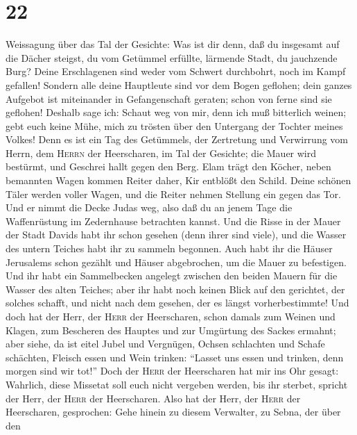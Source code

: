 \hypertarget{section-21}{%
\section{22}\label{section-21}}

 Weissagung über das Tal der Gesichte: Was ist dir denn,
daß du insgesamt auf die Dächer steigst,  du vom Getümmel
erfüllte, lärmende Stadt, du jauchzende Burg? Deine Erschlagenen sind
weder vom Schwert durchbohrt, noch im Kampf gefallen! 
Sondern alle deine Hauptleute sind vor dem Bogen geflohen; dein ganzes
Aufgebot ist miteinander in Gefangenschaft geraten; schon von ferne sind
sie geflohen!  Deshalb sage ich: Schaut weg von mir, denn
ich muß bitterlich weinen; gebt euch keine Mühe, mich zu trösten über
den Untergang der Tochter meines Volkes!  Denn es ist ein
Tag des Getümmels, der Zertretung und Verwirrung vom Herrn, dem
\textsc{Herrn} der Heerscharen, im Tal der Gesichte; die Mauer wird
bestürmt, und Geschrei hallt gegen den Berg.  Elam trägt
den Köcher, neben bemannten Wagen kommen Reiter daher, Kir entblößt den
Schild.  Deine schönen Täler werden voller Wagen, und die
Reiter nehmen Stellung ein gegen das Tor.  Und er nimmt
die Decke Judas weg, also daß du an jenem Tage die Waffenrüstung im
Zedernhause betrachten kannst.  Und die Risse in der Mauer
der Stadt Davids habt ihr schon gesehen (denn ihrer sind viele), und die
Wasser des untern Teiches habt ihr zu sammeln begonnen. 
Auch habt ihr die Häuser Jerusalems schon gezählt und Häuser
abgebrochen, um die Mauer zu befestigen.  Und ihr habt
ein Sammelbecken angelegt zwischen den beiden Mauern für die Wasser des
alten Teiches; aber ihr habt noch keinen Blick auf den gerichtet, der
solches schafft, und nicht nach dem gesehen, der es längst
vorherbestimmte!  Und doch hat der Herr, der
\textsc{Herr} der Heerscharen, schon damals zum Weinen und Klagen, zum
Bescheren des Hauptes und zur Umgürtung des Sackes ermahnt;
 aber siehe, da ist eitel Jubel und Vergnügen, Ochsen
schlachten und Schafe schächten, Fleisch essen und Wein trinken:
``Lasset uns essen und trinken, denn morgen sind wir tot!''
 Doch der \textsc{Herr} der Heerscharen hat mir ins Ohr
gesagt: Wahrlich, diese Missetat soll euch nicht vergeben werden, bis
ihr sterbet, spricht der Herr, der \textsc{Herr} der Heerscharen.
 Also hat der Herr, der \textsc{Herr} der Heerscharen,
gesprochen: Gehe hinein zu diesem Verwalter, zu Sebna, der über den
